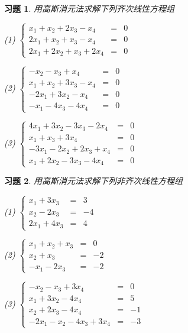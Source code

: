\documentclass[a4paper]{book}
\newtheorem{ex}{习题}[chapter]
\newcommand{\enum}{\begin{list}{}{\setlength{\leftmargin}{0pt} \setlength{\itemindent}{2.5em} \setlength{\listparindent}{2em}}}
\begin{document}
\begin{ex} \label{ex:1.6}
用高斯消元法求解下列齐次线性方程组
\enum
\item[(1)] $\left\{ \begin{array}{rcl} x_1 + x_2 + 2x_3 - x_4 & = & 0 \\ 2x_1 + x_2 + x_3 - x_4 & = & 0 \\ 2x_1 + 2x_2 + x_3 + 2x_4 & = & 0 \end{array}\right.$
\item[(2)] $\left\{ \begin{array}{rcl} - x_2 -x_3 + x_4 & = & 0 \\ x_1 + x_2 + 3x_3 - x_4 & = & 0 \\ -2x_1 + 3x_2 - x_4 & = & 0 \\ -x_1 - 4x_3 - 4x_4 & = & 0\end{array}\right.$
\item[(3)] $\left\{ \begin{array}{rcl} 4x_1 + 3x_2 - 3x_3 - 2x_4 & = & 0 \\ x_1 + x_3 + 3x_4 & = & 0 \\ -3x_1 - 2x_2 + 2x_3 + x_4 & = & 0 \\ x_1 + 2x_2 - 3x_3 - 4x_4 & = & 0\end{array}\right.$
\end{list}
\end{ex}

\begin{ex} \label{ex:1.7}
用高斯消元法求解下列非齐次线性方程组
\enum
\item[(1)] $\left\{ \begin{array}{rcl} x_1 + 3x_3 & = & 3 \\ x_2 - 2x_3 & = & -4 \\ 2x_1 + 4x_3 & = & 4 \end{array}\right.$
\item[(2)] $\left\{ \begin{array}{rcl} x_1 + x_2 + x_3 & = & 0 \\ x_2 + x_3 & = & -2 \\ -x_1 - 2x_3 & = & -2 \end{array}\right.$
\item[(3)] $\left\{ \begin{array}{rcl} - x_2 -x_3 + 3x_4 & = & 0 \\ x_1 + 3x_2 - 4x_4 & = & 5 \\  x_2 + 2x_3 - 4x_4 & = & -1 \\ -2x_1 - x_2- 4x_3 + 3x_4 & = & -3\end{array}\right.$
\end{list}
\end{ex}
\end{document}
